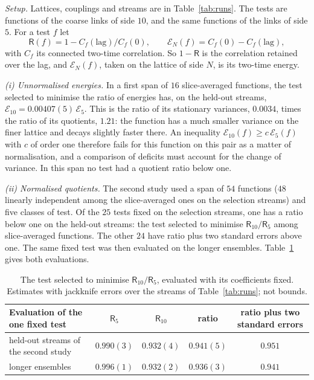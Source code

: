 \emph{Setup.} Lattices, couplings and streams are in Table~\ref{tab:runs}. The tests are functions of the
coarse links of side $10$, and the same functions of the links of side $5$. For a test $f$ let
\[
\mathsf R(f)=1-C_f(\mathrm{lag})/C_f(0),\qquad \mathcal E_N(f)=C_f(0)-C_f(\mathrm{lag}),
\]
with $C_f$ its connected two-time correlation. So $1-\mathsf R$ is the correlation retained over the lag, and
$\mathcal E_N(f)$, taken on the lattice of side $N$, is its two-time energy.

\emph{{\upshape(i)} Unnormalised energies.} In a first span of $16$ slice-averaged functions, the test
selected to minimise the ratio of energies has, on the held-out streams,
$\mathcal E_{10}=0.00407(5)\,\mathcal E_5$. This is the ratio of its stationary variances, $0.0034$, times the
ratio of its quotients, $1.21$: the function has a much smaller variance on the finer lattice and decays
slightly faster there. An inequality $\mathcal E_{10}(f)\ge c\,\mathcal E_5(f)$ with $c$ of order one
therefore fails for this function on this pair as a matter of normalisation, and a comparison of deficits
must account for the change of variance. In this span no test had a quotient ratio below one.

\emph{{\upshape(ii)} Normalised quotients.} The second study used a span of $54$ functions ($48$ linearly
independent among the slice-averaged ones on the selection streams) and five classes of test. Of the $25$
tests fixed on the selection streams, one has a ratio below one on the held-out streams: the test selected to
minimise $\mathsf R_{10}/\mathsf R_5$ among slice-averaged functions. The other $24$ have ratio plus two
standard errors above one. The same fixed test was then evaluated on the longer ensembles.
Table~\ref{tab:cross} gives both evaluations.

\begin{table}[ht]
\centering\small
\begin{tabular}{@{}lcccc@{}}
\toprule
Evaluation of the one fixed test & $\mathsf R_5$ & $\mathsf R_{10}$ & ratio & ratio plus two standard errors \\
\midrule
held-out streams of the second study & $0.990(3)$ & $0.932(4)$ & $0.941(5)$ & $0.951$ \\
longer ensembles & $0.996(1)$ & $0.932(2)$ & $0.936(3)$ & $0.941$ \\
\bottomrule
\end{tabular}
\caption{The test selected to minimise $\mathsf R_{10}/\mathsf R_5$, evaluated with its coefficients fixed.
Estimates with jackknife errors over the streams of Table~\ref{tab:runs}; not bounds.}\label{tab:cross}
\end{table}

